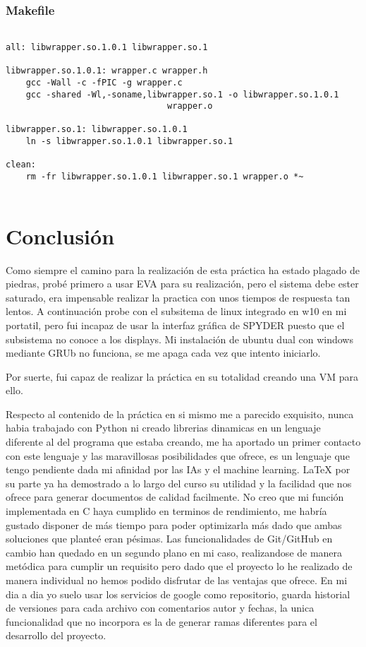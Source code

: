 \documentclass[10pt,journal,compsoc]{IEEEtran}
\begin{document}
\subsubsection{Makefile}

\begin{lstlisting}[basicstyle=\tiny]

all: libwrapper.so.1.0.1 libwrapper.so.1

libwrapper.so.1.0.1: wrapper.c wrapper.h
	gcc -Wall -c -fPIC -g wrapper.c
	gcc -shared -Wl,-soname,libwrapper.so.1 -o libwrapper.so.1.0.1 
								wrapper.o

libwrapper.so.1: libwrapper.so.1.0.1
	ln -s libwrapper.so.1.0.1 libwrapper.so.1

clean:
	rm -fr libwrapper.so.1.0.1 libwrapper.so.1 wrapper.o *~ 


\end{lstlisting}


\section{Conclusión}

Como siempre el camino para la realización de esta práctica ha estado plagado de piedras, probé primero a usar EVA para su realización, pero el sistema debe ester saturado, era impensable realizar la practica con unos tiempos de respuesta tan lentos. A continuación probe con el subsitema de linux integrado en w10 en mi portatil, pero fui incapaz de usar la interfaz gráfica de SPYDER puesto que el subsistema no conoce a los displays. Mi instalación de ubuntu dual con windows mediante GRUb no funciona, se me apaga cada vez que intento iniciarlo. 

Por suerte, fui capaz de realizar la práctica en su totalidad creando una VM para ello.

Respecto al contenido de la práctica en si mismo me a parecido exquisito, nunca habia trabajado con Python ni creado librerias dinamicas en un lenguaje diferente al del programa que estaba creando, me ha aportado un primer contacto con este lenguaje y las maravillosas posibilidades que ofrece, es un lenguaje que tengo pendiente dada mi afinidad por las IAs y el machine learning. LaTeX por su parte ya ha demostrado a lo largo del curso su utilidad y la facilidad que nos ofrece para generar documentos de calidad facilmente.
No creo que mi función implementada en C haya cumplido en terminos de rendimiento, me habría gustado disponer de más tiempo para poder optimizarla más dado que ambas soluciones que planteé eran pésimas.
Las funcionalidades de Git/GitHub en cambio han quedado en un segundo plano en mi caso, realizandose de manera metódica para cumplir un requisito pero dado que el proyecto lo he realizado de manera individual no hemos podido disfrutar de las ventajas que ofrece.
En mi dia a dia yo suelo usar los servicios de google como repositorio, guarda historial de versiones para cada archivo con comentarios autor y fechas, la unica funcionalidad que no incorpora es la de generar ramas diferentes para el desarrollo del proyecto.
\end{document}
